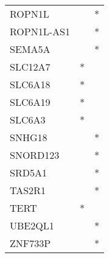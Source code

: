 \begin{longtable}{lcc}
ROPN1L        &                &          * \\
ROPN1L-AS1    &                &          * \\
SEMA5A        &                &          * \\
SLC12A7       &              * &            \\
SLC6A18       &              * &            \\
SLC6A19       &              * &            \\
SLC6A3        &              * &            \\
SNHG18        &                &          * \\
SNORD123      &                &          * \\
SRD5A1        &                &          * \\
TAS2R1        &                &          * \\
TERT          &              * &            \\
UBE2QL1       &                &          * \\
ZNF733P       &                &          * \\
\end{longtable}

